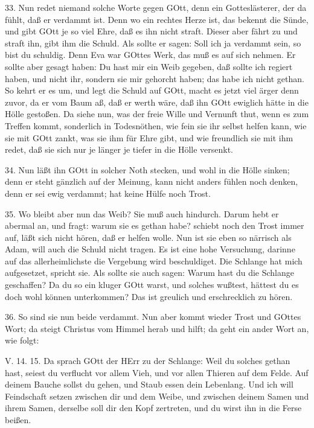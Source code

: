 33. Nun redet niemand solche Worte gegen GOtt, denn ein Gotteslästerer, der da fühlt, daß er verdammt ist. Denn wo ein rechtes Herze ist, das bekennt die Sünde, und gibt GOtt je so viel Ehre, daß es ihn nicht straft. Dieser aber fährt zu und straft ihn, gibt ihm die Schuld. Als sollte er sagen: Soll ich ja verdammt sein, so bist du schuldig. Denn Eva war GOttes Werk, das muß es auf sich nehmen. Er sollte aber gesagt haben: Du hast mir ein Weib gegeben, daß sollte ich regiert haben, und nicht ihr, sondern sie mir gehorcht haben; das habe ich nicht gethan. So kehrt er es um, und legt die Schuld auf GOtt, macht es jetzt viel ärger denn zuvor, da er vom Baum aß, daß er werth wäre, daß ihn GOtt ewiglich hätte in die Hölle gestoßen. Da siehe nun, was der freie Wille und Vernunft thut, wenn es zum Treffen kommt, sonderlich in Todesnöthen, wie fein sie ihr selbst helfen kann, wie sie mit GOtt zankt, was sie ihm für Ehre gibt, und wie freundlich sie mit ihm redet, daß sie sich nur je länger je tiefer in die Hölle versenkt.

34. Nun läßt ihn GOtt in solcher Noth stecken, und wohl in die Hölle sinken; denn er steht gänzlich auf der Meinung, kann nicht anders fühlen noch denken, denn er sei ewig verdammt; hat keine Hülfe noch Trost.

35. Wo bleibt aber nun das Weib? Sie muß auch hindurch. Darum hebt er abermal an, und fragt: warum sie es gethan habe? schiebt noch den Trost immer auf, läßt sich nicht hören, daß er helfen wolle. Nun ist sie eben so närrisch als Adam, will auch die Schuld nicht tragen. Es ist eine hohe Versuchung, darinne auf das allerheimlichste die Vergebung wird beschuldiget. Die Schlange hat mich aufgesetzet, spricht sie. Als sollte sie auch sagen: Warum hast du die Schlange geschaffen? Da du so ein kluger GOtt warst, und solches wußtest, hättest du es doch wohl können unterkommen? Das ist greulich und erschrecklich zu hören.

36. So sind sie nun beide verdammt. Nun aber kommt wieder Trost und GOttes Wort; da steigt Christus vom Himmel herab und hilft; da geht ein ander Wort an, wie folgt:

\begin{schriftzitat}
V. 14. 15. Da sprach GOtt der HErr zu der Schlange: Weil du solches gethan hast, seiest du verflucht vor allem Vieh, und vor allen Thieren auf dem Felde. Auf deinem Bauche sollst du gehen, und Staub essen dein Lebenlang. Und ich will Feindschaft setzen zwischen dir und dem Weibe, und zwischen deinem Samen und ihrem Samen, derselbe soll dir den Kopf zertreten, und du wirst ihn in die Ferse beißen.
\end{schriftzitat}

